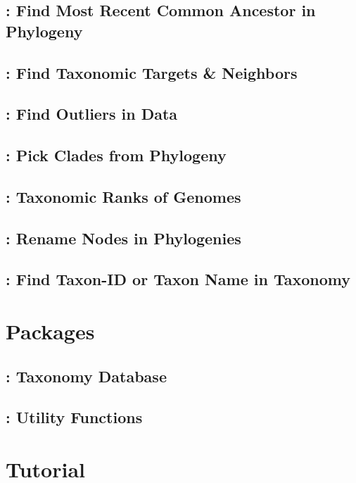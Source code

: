 \documentclass[a4paper]{book}
\begin{document}
\chapter{: Find Most Recent Common Ancestor in Phylogeny}

\chapter{: Find Taxonomic Targets \& Neighbors}

\chapter{: Find Outliers in Data}\label{sec:out}

\chapter{: Pick Clades from Phylogeny}

\chapter{: Taxonomic Ranks of Genomes}

\chapter{: Rename Nodes in Phylogenies}

\chapter{: Find Taxon-ID or Taxon Name in Taxonomy}

\part{Packages}
\chapter{: Taxonomy Database}

\chapter{: Utility Functions}

\part{Tutorial}



\end{document}
